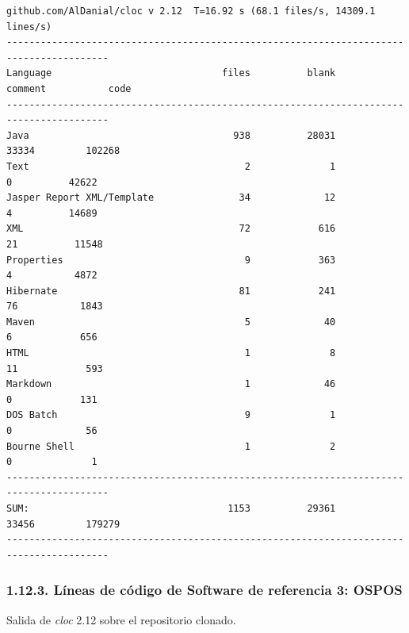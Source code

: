 \begingroup\footnotesize
\begin{verbatim}
github.com/AlDanial/cloc v 2.12  T=16.92 s (68.1 files/s, 14309.1 lines/s)
----------------------------------------------------------------------------------------
Language                              files          blank        comment           code
----------------------------------------------------------------------------------------
Java                                    938          28031          33334         102268
Text                                      2              1              0          42622
Jasper Report XML/Template               34             12              4          14689
XML                                      72            616             21          11548
Properties                                9            363              4           4872
Hibernate                                81            241             76           1843
Maven                                     5             40              6            656
HTML                                      1              8             11            593
Markdown                                  1             46              0            131
DOS Batch                                 9              1              0             56
Bourne Shell                              1              2              0              1
----------------------------------------------------------------------------------------
SUM:                                   1153          29361          33456         179279
----------------------------------------------------------------------------------------
\end{verbatim}
\endgroup

\subsubsection{1.12.3. Líneas de código de Software de referencia 3: OSPOS}

Salida de \textit{cloc} 2.12 sobre el repositorio clonado.

